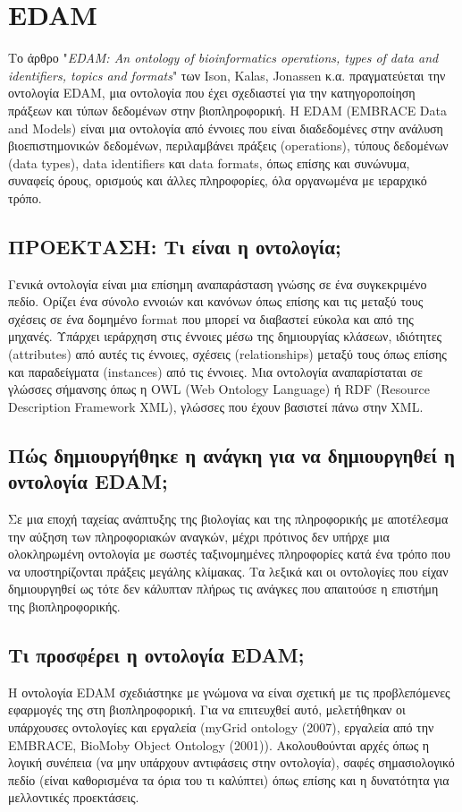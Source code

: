 

\section{EDAM}
    Το άρθρο "\textit{EDAM: An ontology of bioinformatics operations, types of data and identifiers, topics and formats}" των Ison, Kalas, Jonassen κ.α. πραγματεύεται την οντολογία EDAM, μια οντολογία που έχει σχεδιαστεί για την κατηγοροποίηση πράξεων και τύπων δεδομένων στην βιοπληροφορική. \cite{EDAMpaper}
    Η EDAM (EMBRACE Data and Models) είναι μια οντολογία από έννοιες που είναι διαδεδομένες στην ανάλυση βιοεπιστημονικών δεδομένων, περιλαμβάνει πράξεις (operations), τύπους δεδομένων (data types), data identifiers και data formats, όπως επίσης και συνώνυμα, συναφείς όρους, ορισμούς και άλλες πληροφορίες, όλα οργανωμένα με ιεραρχικό τρόπο. \cite{EDAMsite}

    \subsection{ΠΡΟΕΚΤΑΣΗ: Τι είναι η οντολογία;}
        Γενικά οντολογία είναι μια επίσημη αναπαράσταση γνώσης σε ένα συγκεκριμένο πεδίο.
        Ορίζει ένα σύνολο εννοιών και κανόνων όπως επίσης και τις μεταξύ τους σχέσεις σε ένα δομημένο format που μπορεί να διαβαστεί εύκολα και από της μηχανές.
        Υπάρχει ιεράρχηση στις έννοιες μέσω της δημιουργίας κλάσεων, ιδιότητες (attributes) από αυτές τις έννοιες, σχέσεις (relationships) μεταξύ τους όπως επίσης και παραδείγματα (instances) από τις έννοιες.
        Μια οντολογία αναπαρίσταται σε γλώσσες σήμανσης όπως η OWL (Web Ontology Language) ή RDF (Resource Description Framework XML), γλώσσες που έχουν βασιστεί πάνω στην XML. \cite{OntologyWiki} \cite{BioOntologies}

    \subsection{Πώς δημιουργήθηκε η ανάγκη για να δημιουργηθεί η οντολογία EDAM;}
        Σε μια εποχή ταχείας ανάπτυξης της βιολογίας και της πληροφορικής με αποτέλεσμα την αύξηση των πληροφοριακών αναγκών, μέχρι πρότινος δεν υπήρχε μια ολοκληρωμένη οντολογία με σωστές ταξινομημένες πληροφορίες κατά ένα τρόπο που να υποστηρίζονται πράξεις μεγάλης κλίμακας.
        Τα λεξικά και οι οντολογίες που είχαν δημιουργηθεί ως τότε δεν κάλυπταν πλήρως τις ανάγκες που απαιτούσε η επιστήμη της βιοπληροφορικής.

    \subsection{Τι προσφέρει η οντολογία EDAM;}
        Η οντολογία EDAM σχεδιάστηκε με γνώμονα να είναι σχετική με τις προβλεπόμενες εφαρμογές της στη βιοπληροφορική.
        Για να επιτευχθεί αυτό, μελετήθηκαν οι υπάρχουσες οντολογίες και εργαλεία (myGrid ontology (2007), εργαλεία από την EMBRACE, BioMoby Object Ontology (2001)).
        Ακολουθούνται αρχές όπως η λογική συνέπεια (να μην υπάρχουν αντιφάσεις στην οντολογία), σαφές σημασιολογικό πεδίο (είναι καθορισμένα τα όρια του τι καλύπτει) όπως επίσης και η δυνατότητα για μελλοντικές προεκτάσεις.

